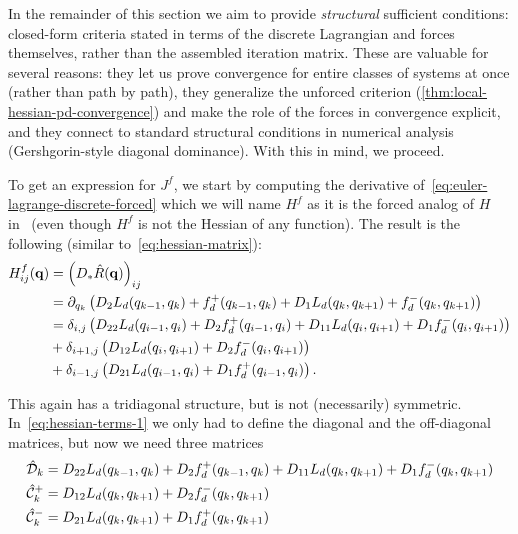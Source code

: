 In the remainder of this section we aim to provide \emph{structural} sufficient conditions: closed-form criteria stated in terms of the discrete Lagrangian and forces themselves, rather than the assembled iteration matrix. These are valuable for several reasons: they let us prove convergence for entire classes of systems at once (rather than path by path), they generalize the unforced criterion (\cref{thm:local-hessian-pd-convergence}) and make the role of the forces in convergence explicit, and they connect to standard structural conditions in numerical analysis (Gershgorin-style diagonal dominance). With this in mind, we proceed.

\bigskip

To get an expression for $J^f$, we start by computing the derivative of~\eqref{eq:euler-lagrange-discrete-forced} which we will name $H^f$ as it is the forced analog of $H$ in~\cite{ferraroParallelIterativeMethod2025} (even though $H^f$ is not the Hessian of any function). The result is the following (similar to~\eqref{eq:hessian-matrix}):
\begin{align*}
	H^f_{ij} (\mathbf{q})
	 & = \left(D_{*}{\hat{R}(\mathbf{q})}\right)_{ij}                                                                                                              \\
	 & = \pdv{\left(D_{2} L_d (q_{k-1}, q_k) + f_d^+ (q_{k-1}, q_k) + D_{1} L_d (q_k, q_{k+1}) + f_d^- (q_k, q_{k+1})\right)}!{q_k}                           \\
	 & = \delta_{i, j} \left( D_{22}{L_d}(q_{i - 1}, q_i) + D_{2}{f_d^+}(q_{i-1}, q_i) + D_{11}{L_d}(q_i, q_{i+1}) + D_{1}{f_d^-}(q_i, q_{i+1}) \right) \\
	 & + \delta_{i+1,j} \left(D_{12}{L_d}(q_i, q_{i+1}) + D_{2}{f_d^-}(q_i, q_{i+1}) \right)                                                                  \\
	 & + \delta_{i-1,j} \left(D_{21}{L_d}(q_{i-1}, q_i) + D_{1}{f_d^+}(q_{i-1}, q_i) \right).
\end{align*}

This again has a tridiagonal structure, but is not (necessarily) symmetric. In~\eqref{eq:hessian-terms-1} we only had to define the diagonal and the off-diagonal matrices, but now we need three matrices
\begin{align*}
	\hat{\mathcal{D}}_k   & = D_{22} L_d(q_{k-1}, q_k) + D_{2} f_d^+(q_{k-1}, q_k) + D_{11} L_d(q_k, q_{k+1}) + D_{1} f_d^-(q_k, q_{k+1}) \\
	\hat{\mathcal{C}}^+_k & = D_{12} L_d(q_k, q_{k+1}) + D_{2} f_d^-(q_k, q_{k+1})                                                              \\
	\hat{\mathcal{C}}^-_k & = D_{21} L_d(q_k, q_{k+1}) + D_{1} f_d^+(q_k, q_{k+1})
\end{align*}

